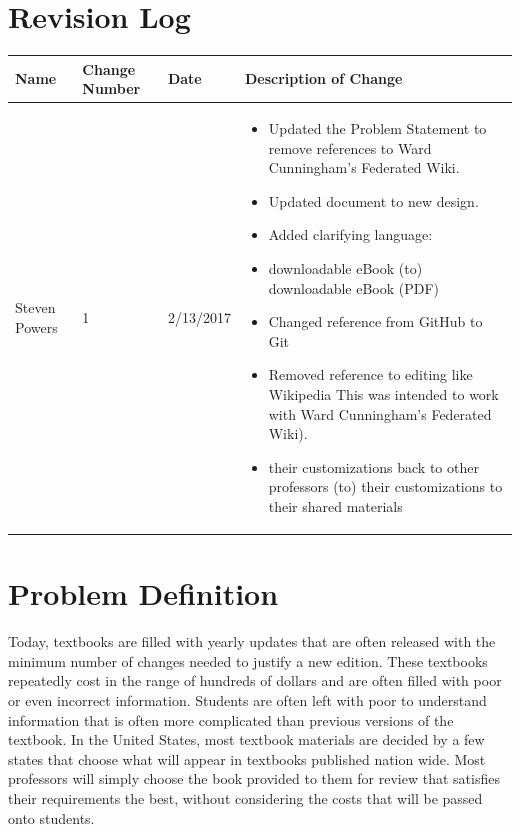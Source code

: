 \documentclass[onecolumn, draftclsnofoot,10pt, compsoc]{IEEEtran}
\begin{document}
\newpage
{}
\tableofcontents
\clearpage


\section{Revision Log}
\begin{flushleft}
\tablehead{}
\begin{supertabular}{|p{3cm}|p{3cm}|p{3cm}|p{7cm}|}
\hline
Name & Change Number & Date & Description of Change  
\\\hline
Steven Powers & 1 & 2/13/2017 & 
\begin{itemize}
\item{Updated the Problem Statement to remove references to Ward Cunningham's Federated Wiki.}
\item{Updated document to new design.}
\item{Added clarifying language:}
\item{downloadable eBook (to) downloadable eBook (PDF)} 
\item{Changed reference from GitHub to Git} 
\item{Removed reference to editing like Wikipedia 
	This was intended to work with Ward Cunningham's Federated Wiki).} 
\item{their customizations back to other professors (to) their customizations to their shared materials}
\end{itemize}
\\ \hline

\end{supertabular}
\end{flushleft}



\section{Problem Definition}
\noindent Today, textbooks are filled with yearly updates that 
are often released with the minimum number of changes needed to 
justify a new edition. These textbooks repeatedly cost in the range of 
hundreds of dollars and are often filled with poor or even incorrect 
information. 
Students are often left with poor to understand information that is often more
complicated than previous versions of the textbook.
In the United States, most textbook materials are decided by a few 
states that choose what will appear in textbooks published nation wide. 
Most professors will simply choose the book provided to them for 
review that satisfies their requirements the best, without considering 
the costs that will be passed onto students. \\
\end{document}
